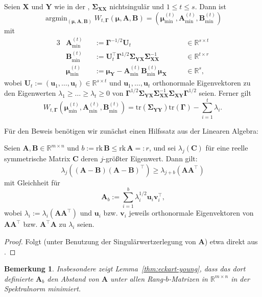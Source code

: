 \documentclass[]{article}
\newcommand{\R}{\mathbb{R}}
\newcommand{\X}{\mathbf{X}}
\newcommand{\Y}{\mathbf{Y}}
\newcommand{\muu}{\bm{\mu}}
\newcommand{\Ssigma}{\mathbf{\Sigma}}
\newcommand{\uu}{\mathbf{u}}
\newcommand{\C}{\mathbf{C}}
\newcommand{\rk}{\mathrm{rk}}
\newcommand{\A}{\mathbf{A}}
\newcommand{\B}{\mathbf{B}}
\newcommand{\Ggamma}{\mathbf{\Gamma}}
\newcommand{\tr}{\mathrm{tr}}
\newtheorem*{remark}{Bemerkung}
\DeclareMathOperator*{\argmin}{argmin}
\begin{document}
\begin{theorem}
	\label{thm:rrr}
	Seien $\X$ und $\Y$ wie in der , $\Ssigma_{\X\X}$ nichtsingulär und $1 \leq t \leq s$. Dann ist
	$$\argmin_{(\muu, \A, \B)} W_{t, \Ggamma}(\muu, \A, \B) = (\muu^{(t)}_{\min}, \A^{(t)}_{\min}, \B^{(t)}_{\min})$$ mit
	\begin{alignat*}{3}
		&\A^{(t)}_{\min}   &&:= \Ggamma^{-1/2} \mathbf{U}_t                                       &&\quad \in \R^{s \times t} \\
		&\B^{(t)}_{\min}   &&:= \mathbf{U}_t^\top \Ggamma^{1/2} \Ssigma_{\Y\X}\Ssigma_{\X\X}^{-1} &&\quad \in \R^{t \times r} \\
		&\muu^{(t)}_{\min} &&:= \muu_\Y - \A^{(t)}_{\min} \B^{(t)}_{\min} \muu_\X                 &&\quad \in \R^s \text{,}
	\end{alignat*}
	wobei $\mathbf{U}_t := (\uu_1,\dots, \uu_t) \in \R^{s \times t}$ und $\uu_1,\dots, \uu_t$ orthonormale Eigenvektoren zu den Eigenwerten $\lambda_1 \geq \dots \geq \lambda_t \geq 0$ von $\Ggamma^{1/2} \Ssigma_{\Y\X} \Ssigma_{\X\X}^{-1} \Ssigma_{\X\Y} \Ggamma^{1/2}$ seien.
	Ferner gilt
	$$W_{t, \Ggamma}(\muu^{(t)}_{\min}, \A^{(t)}_{\min}, \B^{(t)}_{\min}) = \tr(\Ssigma_{\Y\Y}) \tr(\Ggamma) - \sum_{i=1}^{t} \lambda_i \text{.}$$
\end{theorem}

Für den Beweis benötigen wir zunächst einen Hilfssatz aus der Linearen Algebra:

\begin{lemma}
	\label{thm:eckart-young}
	Seien $\A, \B \in \R^{m \times n}$ und $b := \rk \, \B \leq \rk \, \A =: r$, und sei
	$\lambda_j(\C)$ für eine reelle symmetrische Matrix $\C$ deren $j$-größter Eigenwert.
	Dann gilt:
	$$\lambda_j((\A - \B)(\A - \B)^\top) \geq \lambda_{j+b}(\A \A^\top)$$
	mit Gleichheit für
	$$\A_b := \sum_{i=1}^{b} \lambda_i^{1/2} \mathbf{u}_i \mathbf{v}_i^\top \text{,}$$
	wobei $\lambda_i := \lambda_i(\A \A^\top)$ und $\mathbf{u}_i$ bzw. $\mathbf{v}_i$ jeweils orthonormale Eigenvektoren von $\A \A^\top$ bzw. 
	$\A^\top \A$ zu $\lambda_i$ seien.
\end{lemma}

\begin{proof}
	Folgt (unter Benutzung der Singulärwertzerlegung von $\A$) etwa direkt aus \cite[Satz 4.6]{BZ21}.
\end{proof}

\begin{remark}
	\normalfont
	Insbesondere zeigt Lemma~\ref{thm:eckart-young}, dass das dort definierte $\A_b$ den Abstand von $\A$ unter allen Rang-$b$-Matrizen in $\R^{m \times n}$ in der Spektralnorm minimiert.
\end{remark}
\end{document}
